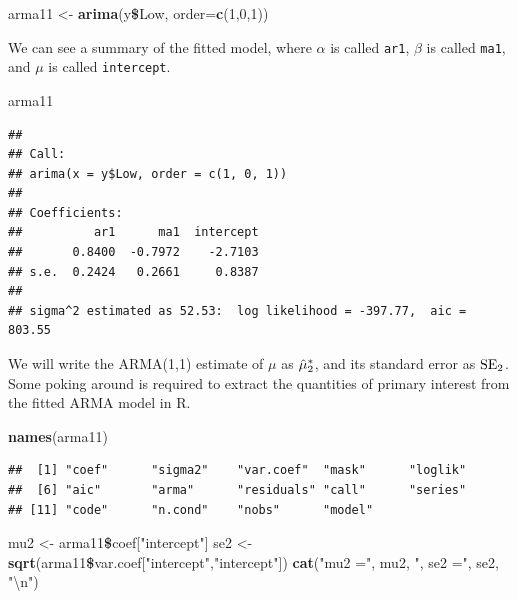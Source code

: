 \documentclass[]{article}
\newenvironment{Shaded}{\begin{snugshade}}{\end{snugshade}}
\newcommand{\KeywordTok}[1]{\textcolor[rgb]{0.13,0.29,0.53}{\textbf{#1}}}
\newcommand{\DataTypeTok}[1]{\textcolor[rgb]{0.13,0.29,0.53}{#1}}
\newcommand{\DecValTok}[1]{\textcolor[rgb]{0.00,0.00,0.81}{#1}}
\newcommand{\CharTok}[1]{\textcolor[rgb]{0.31,0.60,0.02}{#1}}
\newcommand{\StringTok}[1]{\textcolor[rgb]{0.31,0.60,0.02}{#1}}
\newcommand{\OperatorTok}[1]{\textcolor[rgb]{0.81,0.36,0.00}{\textbf{#1}}}
\newcommand{\NormalTok}[1]{#1}
\begin{document}
\begin{Shaded}
\begin{Highlighting}[]
\NormalTok{arma11 <-}\StringTok{ }\KeywordTok{arima}\NormalTok{(y}\OperatorTok{\$}\NormalTok{Low, }\DataTypeTok{order=}\KeywordTok{c}\NormalTok{(}\DecValTok{1}\NormalTok{,}\DecValTok{0}\NormalTok{,}\DecValTok{1}\NormalTok{))}
\end{Highlighting}
\end{Shaded}

We can see a summary of the fitted model, where \(\alpha\) is called
\texttt{ar1}, \(\beta\) is called \texttt{ma1}, and \(\mu\) is called
\texttt{intercept}.

\begin{Shaded}
\begin{Highlighting}[]
\NormalTok{arma11}
\end{Highlighting}
\end{Shaded}

\begin{verbatim}
## 
## Call:
## arima(x = y$Low, order = c(1, 0, 1))
## 
## Coefficients:
##          ar1      ma1  intercept
##       0.8400  -0.7972    -2.7103
## s.e.  0.2424   0.2661     0.8387
## 
## sigma^2 estimated as 52.53:  log likelihood = -397.77,  aic = 803.55
\end{verbatim}


We will write the ARMA(1,1) estimate of \(\mu\) as
\(\hat\mu_2^*\), and its standard error as \(\mathrm{SE}_2\). Some
poking around is required to extract the quantities of primary interest
from the fitted ARMA model in R.

\begin{Shaded}
\begin{Highlighting}[]
\KeywordTok{names}\NormalTok{(arma11)}
\end{Highlighting}
\end{Shaded}

\begin{verbatim}
##  [1] "coef"      "sigma2"    "var.coef"  "mask"      "loglik"   
##  [6] "aic"       "arma"      "residuals" "call"      "series"   
## [11] "code"      "n.cond"    "nobs"      "model"
\end{verbatim}

\begin{Shaded}
\begin{Highlighting}[]
\NormalTok{mu2 <-}\StringTok{ }\NormalTok{arma11}\OperatorTok{\$}\NormalTok{coef[}\StringTok{"intercept"}\NormalTok{]}
\NormalTok{se2 <-}\StringTok{ }\KeywordTok{sqrt}\NormalTok{(arma11}\OperatorTok{\$}\NormalTok{var.coef[}\StringTok{"intercept"}\NormalTok{,}\StringTok{"intercept"}\NormalTok{])}
\KeywordTok{cat}\NormalTok{(}\StringTok{"mu2 ="}\NormalTok{, mu2, }\StringTok{",  se2 ="}\NormalTok{, se2, }\StringTok{"}\CharTok{\textbackslash{}n}\StringTok{"}\NormalTok{)}
\end{Highlighting}
\end{Shaded}
\end{document}
